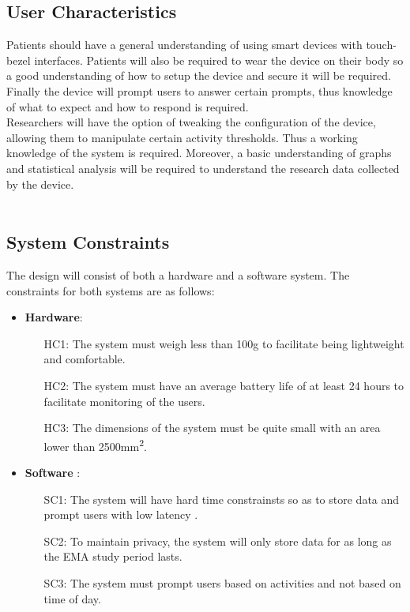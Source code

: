 \documentclass[12pt]{article}
\begin{document}
\subsection{User Characteristics} \label{SecUserCharacteristics}

Patients should have a general understanding of using smart devices with touch-bezel interfaces. Patients will also be required to wear the device on their body so a good understanding of how to setup the device and secure it will be required. Finally the device will prompt users to answer certain prompts, thus knowledge of what to expect and how to respond is required.\\

Researchers will have the option of tweaking the configuration of the device, allowing them to manipulate certain activity thresholds. Thus a working knowledge of the system is required. Moreover, a basic understanding of graphs and statistical analysis will be required to understand the research data collected by the device.\\\\


\subsection{System Constraints}

The design will consist of both a hardware and a software system. The constraints for both systems are as follows:
\begin{itemize}
\item \textbf{Hardware}: 
	\begin{itemize}
		\label{HC1}\item[HC1:] The system must weigh less than 100g to facilitate being lightweight and comfortable.
		\label{HC2}\item[HC2:] The system must have an average battery life of at least 24 hours to facilitate monitoring of the users.
		\label{HC3}\item[HC3:] The dimensions of the system must be quite small with an area lower than 2500mm\textsuperscript{2}.\\
	\end{itemize}

\item \textbf{Software} :
	\begin{itemize}
		\label{SC1}\item[SC1:] The system will have hard time constrainsts so as to store data and prompt users with low latency .
		\label{SC2}\item[SC2:] To maintain privacy, the system will only store data for as long as the EMA study period lasts.
		\label{SC3}\item[SC3:] The system must prompt users based on activities and not based on time of day. 
	\end{itemize}
\end{itemize}
\end{document}
